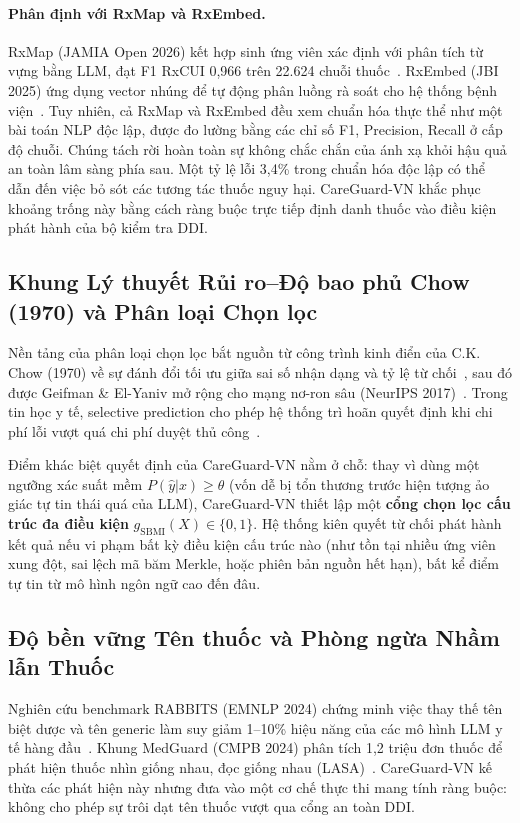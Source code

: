 \documentclass[11pt]{article}
\begin{document}
\paragraph{Phân định với RxMap và RxEmbed.}
RxMap (JAMIA Open 2026) kết hợp sinh ứng viên xác định với phân tích từ vựng bằng LLM, đạt F1 RxCUI 0,966 trên 22.624 chuỗi thuốc~\cite{korpela2026rxmap}. RxEmbed (JBI 2025) ứng dụng vector nhúng để tự động phân luồng rà soát cho hệ thống bệnh viện~\cite{huser2025rxembed}. Tuy nhiên, cả RxMap và RxEmbed đều xem chuẩn hóa thực thể như một bài toán NLP độc lập, được đo lường bằng các chỉ số F1, Precision, Recall ở cấp độ chuỗi. Chúng tách rời hoàn toàn sự không chắc chắn của ánh xạ khỏi hậu quả an toàn lâm sàng phía sau. Một tỷ lệ lỗi 3,4\% trong chuẩn hóa độc lập có thể dẫn đến việc bỏ sót các tương tác thuốc nguy hại. CareGuard-VN khắc phục khoảng trống này bằng cách ràng buộc trực tiếp định danh thuốc vào điều kiện phát hành của bộ kiểm tra DDI.

\subsection{Khung Lý thuyết Rủi ro--Độ bao phủ Chow (1970) và Phân loại Chọn lọc}
Nền tảng của phân loại chọn lọc bắt nguồn từ công trình kinh điển của C.K. Chow (1970) về sự đánh đổi tối ưu giữa sai số nhận dạng và tỷ lệ từ chối~\cite{chow1970}, sau đó được Geifman \& El-Yaniv mở rộng cho mạng nơ-ron sâu (NeurIPS 2017)~\cite{geifman2017selective}. Trong tin học y tế, selective prediction cho phép hệ thống trì hoãn quyết định khi chi phí lỗi vượt quá chi phí duyệt thủ công~\cite{swaminathan2024selective}.

Điểm khác biệt quyết định của CareGuard-VN nằm ở chỗ: thay vì dùng một ngưỡng xác suất mềm $P(\hat{y}|x) \ge \theta$ (vốn dễ bị tổn thương trước hiện tượng ảo giác tự tin thái quá của LLM), CareGuard-VN thiết lập một \textbf{cổng chọn lọc cấu trúc đa điều kiện} $g_{\text{SBMI}}(X) \in \{0, 1\}$. Hệ thống kiên quyết từ chối phát hành kết quả nếu vi phạm bất kỳ điều kiện cấu trúc nào (như tồn tại nhiều ứng viên xung đột, sai lệch mã băm Merkle, hoặc phiên bản nguồn hết hạn), bất kể điểm tự tin từ mô hình ngôn ngữ cao đến đâu.

\subsection{Độ bền vững Tên thuốc và Phòng ngừa Nhầm lẫn Thuốc}
Nghiên cứu benchmark RABBITS (EMNLP 2024) chứng minh việc thay thế tên biệt dược và tên generic làm suy giảm 1--10\% hiệu năng của các mô hình LLM y tế hàng đầu~\cite{gallifant2024rabbits}. Khung MedGuard (CMPB 2024) phân tích 1,2 triệu đơn thuốc để phát hiện thuốc nhìn giống nhau, đọc giống nhau (LASA)~\cite{chen2024medguard}. CareGuard-VN kế thừa các phát hiện này nhưng đưa vào một cơ chế thực thi mang tính ràng buộc: không cho phép sự trôi dạt tên thuốc vượt qua cổng an toàn DDI.
\end{document}
